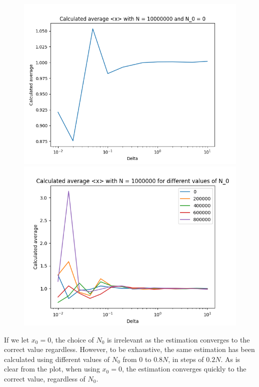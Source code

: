 \documentclass[a4paper,12pt]{article}
\begin{document}
\begin{figure}[!ht]
  \centering
  \begin{minipage}{0.49\textwidth}
    \includegraphics[width=\textwidth]{img/3_1_N0_0.png}
  \end{minipage}
  \begin{minipage}{0.49\textwidth}
    \includegraphics[width=\textwidth]{img/3_1_multiple_N_0.png}
  \end{minipage}
\end{figure}

If we let $x_0 = 0$, the choice of $N_0$ is irrelevant as the estimation converges to the correct value regardless.
However, to be exhaustive, the same estimation has been calculated using different values of $N_0$ from $0$ to $0.8N$,
in steps of $0.2N$. As is clear from the plot, when using $x_0 = 0$, the estimation converges quickly to the correct
value, regardless of $N_0$.
\end{document}

